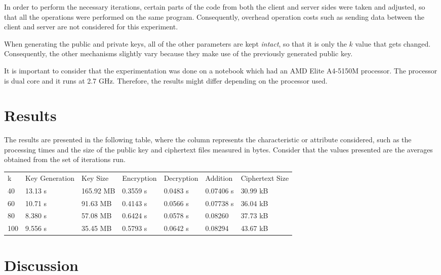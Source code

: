 In order to perform the necessary iterations, certain parts of the code from both the client and server sides were taken and adjusted, so that all the operations were performed on the same program. Consequently, overhead operation costs such as sending data between the client and server are not considered for this experiment.

When generating the public and private keys, all of the other parameters are kept \emph{intact}, so that it is only the $k$ value that gets changed. Consequently, the other mechanisms slightly vary because they make use of the previously generated public key.

It is important to consider that the experimentation was done on a notebook which had an AMD Elite A4-5150M processor. The processor is dual core and it runs at 2.7 GHz. Therefore, the results might differ depending on the processor used.

\section{Results}

The results are presented in the following table, where the column represents the characteristic or attribute considered, such as the processing times and the size of the public key and ciphertext files measured in bytes. Consider that the values presented are the averages obtained from the set of iterations run.

\begin{table}[h]
\begin{tabular}{lllllll}
k   & Key Generation & Key Size  & Encryption & Decryption & Addition & Ciphertext Size \\
40  & 13.13 s             & 165.92 MB & 0.3559 s        & 0.0483 s        & 0.07406 s     & 30.99 kB        \\
60  & 10.71 s             & 91.63 MB  & 0.4143 s        & 0.0566 s        & 0.07738 s     & 36.04 kB        \\
80  & 8.380 s             & 57.08 MB  & 0.6424 s        & 0.0578 s        & 0.08260       & 37.73 kB        \\
100 & 9.556 s             & 35.45 MB  & 0.5793 s        & 0.0642 s        & 0.08294       & 43.67 kB               
\end{tabular}
\end{table}

\section{Discussion}

